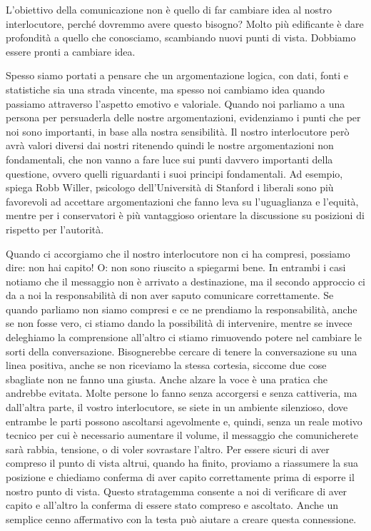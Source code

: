 \documentclass[12pt]{book} %
\begin{document}
L'obiettivo della comunicazione non è quello di far cambiare idea al nostro interlocutore, perché dovremmo avere questo bisogno?
Molto più edificante è dare profondità a quello che conosciamo, scambiando nuovi punti di vista. Dobbiamo essere pronti a cambiare idea.

Spesso siamo portati a pensare che un argomentazione logica, con dati, fonti e statistiche sia una strada vincente, ma
spesso noi cambiamo idea quando passiamo attraverso l'aspetto emotivo e valoriale. Quando
noi parliamo a una persona per persuaderla delle nostre argomentazioni, evidenziamo i punti che per noi sono
importanti, in base alla nostra sensibilità. Il nostro interlocutore però avrà valori diversi dai nostri ritenendo
quindi le nostre argomentazioni non fondamentali, che non vanno a fare luce sui punti davvero importanti della
questione, ovvero quelli riguardanti i suoi principi fondamentali.
Ad esempio, spiega Robb Willer, psicologo dell'Università di Stanford i liberali sono più favorevoli ad accettare argomentazioni
che fanno leva su l'uguaglianza e l'equità, mentre per i conservatori è più vantaggioso orientare la discussione su
posizioni di rispetto per l'autorità.

Quando ci accorgiamo che il nostro interlocutore non ci ha
compresi, possiamo dire: non hai capito! O: non sono riuscito a spiegarmi bene. In entrambi i casi notiamo che il
messaggio non è arrivato a destinazione, ma il secondo approccio ci da a noi la responsabilità di non aver saputo
comunicare correttamente. Se quando parliamo non siamo compresi e ce ne prendiamo la responsabilità, anche se non fosse
vero, ci stiamo dando la possibilità di intervenire, mentre se invece deleghiamo la comprensione
all'altro ci stiamo rimuovendo potere nel cambiare le sorti della conversazione. Bisognerebbe
cercare di tenere la conversazione su una linea positiva, anche se non riceviamo la stessa cortesia, siccome due cose
sbagliate non ne fanno una giusta. Anche alzare la voce è una pratica che andrebbe evitata. Molte persone lo fanno
senza accorgersi e senza cattiveria, ma dall'altra parte, il vostro interlocutore, se siete in un
ambiente silenzioso, dove entrambe le parti possono ascoltarsi agevolmente e, quindi, senza un reale motivo tecnico per
cui è necessario aumentare il volume, il messaggio che comunicherete sarà rabbia, tensione, o di voler sovrastare
l'altro. Per essere sicuri di aver compreso il punto di vista altrui, quando ha finito, proviamo a
riassumere la sua posizione e chiediamo conferma di aver capito correttamente prima di esporre il nostro punto di
vista. Questo stratagemma consente a noi di verificare di aver capito e all'altro la conferma di
essere stato compreso e ascoltato. Anche un semplice cenno affermativo con la testa può aiutare a creare questa connessione. 
\end{document}
